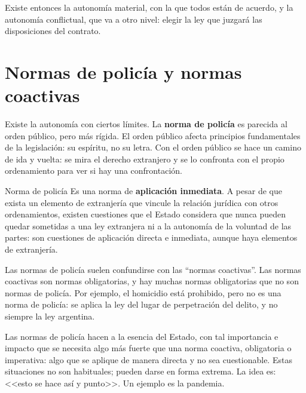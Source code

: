 \documentclass[12pt,oneside]{book}
\begin{document}
Existe entonces la autonom\'ia material, con la que todos est\'an de acuerdo, y la autonom\'ia conflictual, que va a otro nivel: elegir la ley que juzgar\'a las disposiciones del contrato.

\section{Normas de polic\'ia y normas coactivas}

Existe la autonom\'ia con ciertos l\'imites. La \textbf{norma de polic\'ia} es parecida al orden p\'ublico, pero m\'as r\'igida. El orden p\'ublico afecta principios fundamentales de la legislaci\'on: su esp\'iritu, no su letra. Con el orden p\'ublico se hace un camino de ida y vuelta: se mira el derecho extranjero y se lo confronta con el propio ordenamiento para ver si hay una confrontaci\'on.

\begin{definition}{Norma de polic\'ia}
Es una norma de \textbf{aplicaci\'on inmediata}. A pesar de que exista un elemento de extranjer\'ia que vincule la relaci\'on jur\'idica con otros ordenamientos, existen cuestiones que el Estado considera que nunca pueden quedar sometidas a una ley extranjera ni a la autonom\'ia de la voluntad de las partes: son cuestiones de aplicaci\'on directa e inmediata, aunque haya elementos de extranjer\'ia.
\end{definition}

Las normas de polic\'ia suelen confundirse con las ``normas coactivas''. Las normas coactivas son normas obligatorias, y hay muchas normas obligatorias que no son normas de polic\'ia. Por ejemplo, el homicidio est\'a prohibido, pero no es una norma de polic\'ia: se aplica la ley del lugar de perpetraci\'on del delito, y no siempre la ley argentina.

Las normas de polic\'ia hacen a la esencia del Estado, con tal importancia e impacto que se necesita algo m\'as fuerte que una norma coactiva, obligatoria o imperativa: algo que se aplique de manera directa y no sea cuestionable. Estas situaciones no son habituales; pueden darse en forma extrema. La idea es: <<esto se hace as\'i y punto>>. Un ejemplo es la pandemia.
\end{document}
